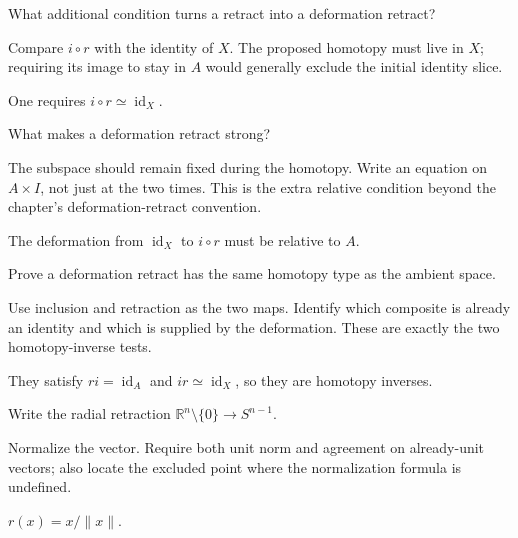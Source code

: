 \begin{exercise}\label{exr:viii02-10}
What additional condition turns a retract into a deformation retract?
\end{exercise}
\begin{hint}Compare \(i\circ r\) with the identity of \(X\).
The proposed homotopy must live in \(X\); requiring its image to stay in \(A\) would generally exclude the initial identity slice.
\end{hint}
\begin{solution}
One requires \(i\circ r\simeq\operatorname{id}_X\).
\end{solution}

\begin{exercise}\label{exr:viii02-11}
What makes a deformation retract strong?
\end{exercise}
\begin{hint}The subspace should remain fixed during the homotopy.
Write an equation on \(A\times I\), not just at the two times. This is the extra relative condition beyond the chapter's deformation-retract convention.
\end{hint}
\begin{solution}
The deformation from \(\operatorname{id}_X\) to \(i\circ r\) must be relative
to \(A\).
\end{solution}

\begin{exercise}\label{exr:viii02-12}
Prove a deformation retract has the same homotopy type as the ambient space.
\end{exercise}
\begin{hint}Use inclusion and retraction as the two maps.
Identify which composite is already an identity and which is supplied by the deformation. These are exactly the two homotopy-inverse tests.
\end{hint}
\begin{solution}
They satisfy \(r i=\operatorname{id}_A\) and
\(i r\simeq\operatorname{id}_X\), so they are homotopy inverses.
\end{solution}

\begin{exercise}\label{exr:viii02-13}
Write the radial retraction \(\mathbb R^n\setminus\{0\}\to S^{n-1}\).
\end{exercise}
\begin{hint}Normalize the vector.
Require both unit norm and agreement on already-unit vectors; also locate the excluded point where the normalization formula is undefined.
\end{hint}
\begin{solution}
\(r(x)=x/\|x\|\).
\end{solution}

